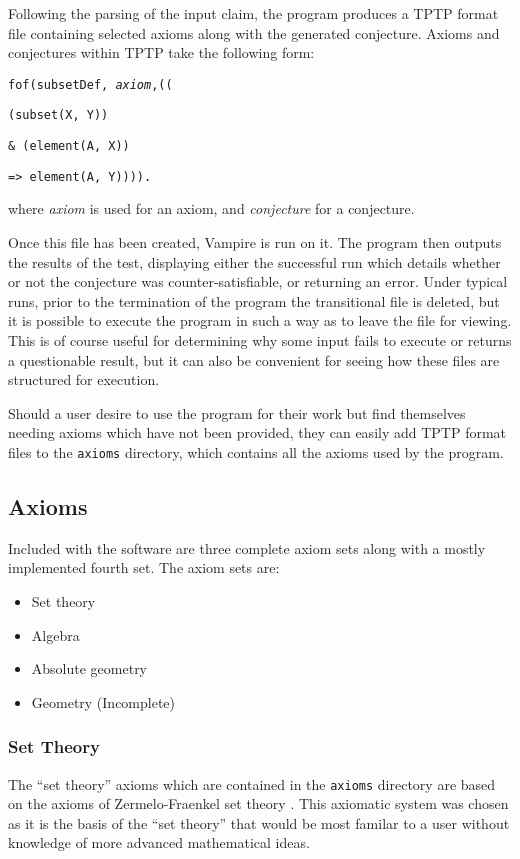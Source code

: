 Following the parsing of the input claim, the program produces a TPTP format file containing selected axioms along with the generated conjecture. Axioms and conjectures within TPTP take the following form:

\texttt{fof(subsetDef, \textit{axiom},((}

\texttt{(subset(X, Y))}

\texttt{\& (element(A, X))}

\texttt{=> element(A, Y)))).}

\noindent
where \textit{axiom} is used for an axiom, and \textit{conjecture} for a conjecture.

Once this file has been created, Vampire is run on it. The program then outputs the results of the test, displaying either the successful run which details whether or not the conjecture was counter-satisfiable, or returning an error. Under typical runs, prior to the termination of the program the transitional file is deleted, but it is possible to execute the program in such a way as to leave the file for viewing. This is of course useful for determining why some input fails to execute or returns a questionable result, but it can also be convenient for seeing how these files are structured for execution.

Should a user desire to use the program for their work but find themselves needing axioms which have not been provided, they can easily add TPTP format files to the \texttt{axioms} directory, which contains all the axioms used by the program.

\subsection{Axioms}

Included with the software are three complete axiom sets along with a mostly implemented fourth set. The axiom sets are:
\begin{itemize}
	\item Set theory
	\item Algebra
	\item Absolute geometry
	\item Geometry (Incomplete)
\end{itemize}

\subsubsection{Set Theory}

The ``set theory'' axioms which are contained in the \texttt{axioms} directory are based on the axioms of Zermelo-Fraenkel set theory \cite{setTheory}. This axiomatic system was chosen as it is the basis of the ``set theory'' that would be most familar to a user without knowledge of more advanced mathematical ideas.

